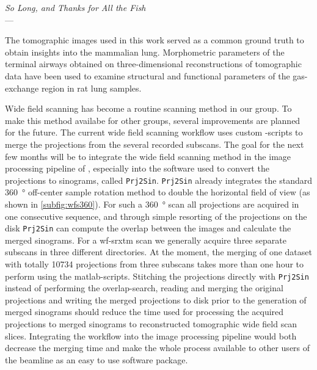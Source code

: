 \acresetall
{}\label{ch:outlook}
\begin{flushright}{\slshape    
		So Long, and Thanks for All the Fish} \\ \medskip
    ---  \citep{Adams1984}
\end{flushright}
\vspace{6cm}

The tomographic images used in this work served as a common ground truth to obtain insights into the mammalian lung. Morphometric parameters of the terminal airways obtained on three-dimensional reconstructions of tomographic data have been used to examine structural and functional parameters of the gas-exchange region in rat lung samples.

Wide field scanning has become a routine scanning method in our group. To make this method availabe for other groups, several improvements are planned for the future. The current wide field scanning workflow uses custom -scripts to merge the projections from the several recorded subscans. The goal for the next few months will be to integrate the wide field scanning method in the image processing pipeline of , especially into the software used to convert the projections to sinograms, called \texttt{Prj2Sin}. \texttt{Prj2Sin} already integrates the standard \SI{360}{\degree} off-center sample rotation method to double the horizontal field of view (as shown in \autoref{subfig:wfs360}). For such a \SI{360}{\degree} scan all projections are acquired in one consecutive sequence, and through simple resorting of the projections on the disk \texttt{Prj2Sin} can compute the overlap between the images and calculate the merged sinograms. For a \ac{wf-srxtm} scan we generally acquire three separate subscans in three different directories. At the moment, the merging of one dataset with totally \num{10734} projections from three subscans takes more than one hour to perform using the \ac{matlab}-scripts. Stitching the projections directly with \texttt{Prj2Sin} instead of performing the overlap-search, reading and merging the original projections and writing the merged projections to disk prior to the generation of merged sinograms should reduce the time used for processing the acquired projections to merged sinograms to reconstructed tomographic wide field scan slices. Integrating the workflow into the image processing pipeline would both decrease the merging time and make the whole process available to other users of the beamline as an easy to use software package.

